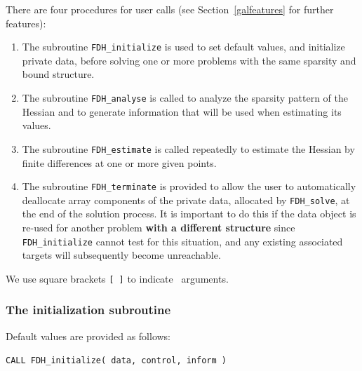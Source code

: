 \documentclass{galahad}
\newcommand{\packagename}{FDH}
\begin{document}




\galarguments
There are four procedures for user calls
(see Section~\ref{galfeatures} for further features): 

\begin{enumerate}
\item The subroutine 
      {\tt \packagename\_initialize} 
      is used to set default values, and initialize private data, 
      before solving one or more problems with the
      same sparsity and bound structure.
\item The subroutine 
      {\tt \packagename\_analyse} 
      is called to analyze the sparsity pattern of the Hessian
      and to generate information that will be used when estimating 
      its values.
\item The subroutine 
      {\tt \packagename\_estimate} 
      is called repeatedly to estimate the Hessian by finite differences at 
      one or more given points.
\item The subroutine 
      {\tt \packagename\_terminate} 
      is provided to allow the user to automatically deallocate array 
       components of the private data, allocated by 
       {\tt \packagename\_solve}, 
       at the end of the solution process. 
       It is important to do this if the data object is re-used for another 
       problem {\bf with a different structure}
       since {\tt \packagename\_initialize} cannot test for this situation, 
       and any existing associated targets will subsequently become unreachable.
\end{enumerate}
We use square brackets {\tt [ ]} to indicate \optional\ arguments.


\subsubsection{The initialization subroutine}\label{subinit}
 Default values are provided as follows:
\vspace*{1mm}

\hspace{8mm}
{\tt CALL \packagename\_initialize( data, control, inform )}
\end{document}
